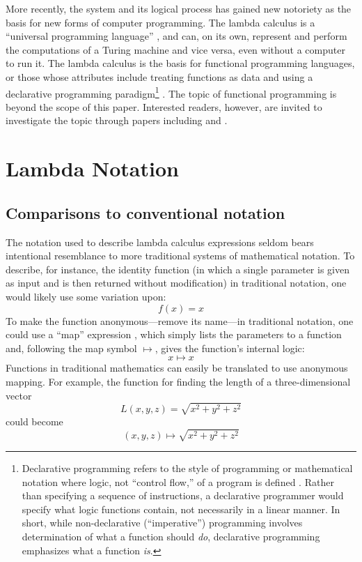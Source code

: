 \documentclass[twocolumn,titlepage,12pt]{article}
\begin{document}
More recently, the system and its logical process has gained new notoriety as the basis for new forms of computer programming. The lambda calculus is a ``universal programming language'' \cite{rojastutorial}, and can, on its own, represent and perform the computations of a Turing machine and vice versa, even without a computer to run it. The lambda calculus is the basis for functional programming languages, or those whose attributes include treating functions as data and using a declarative programming paradigm\footnote{Declarative programming refers to the style of programming or mathematical notation where logic, not ``control flow,'' of a program is defined \cite{declarativeprogadv}. Rather than specifying a sequence of instructions, a declarative programmer would specify what logic functions contain, not necessarily in a linear manner. In short, while non-declarative (``imperative'') programming involves determination of what a function should \textit{do}, declarative programming emphasizes what a function \textit{is}.} \cite{hudakevolution}. The topic of functional programming is beyond the scope of this paper. Interested readers, however, are invited to investigate the topic through papers including \cite{totalfp} and \cite{hudakevolution}.

\section{Lambda Notation}
\subsection{Comparisons to conventional notation}
The notation used to describe lambda calculus expressions seldom bears intentional resemblance to more traditional systems of mathematical notation. To describe, for instance, the identity function (in which a single parameter is given as input and is then returned without modification) in traditional notation, one would likely use some variation upon:
$$f(x)=x$$
To make the function anonymous---remove its name---in traditional notation, one could use a ``map'' expression \cite{intrographtheory}, which simply lists the parameters to a function and, following the map symbol $\mapsto$, gives the function's internal logic:
$$x\mapsto x$$
Functions in traditional mathematics can easily be translated to use anonymous mapping. For example, the function for finding the length of a three-dimensional vector
$$L(x,y,z)=\sqrt{x^2+y^2+z^2}$$
could become
$$(x,y,z) \mapsto \sqrt{x^2+y^2+z^2}$$
\end{document}
